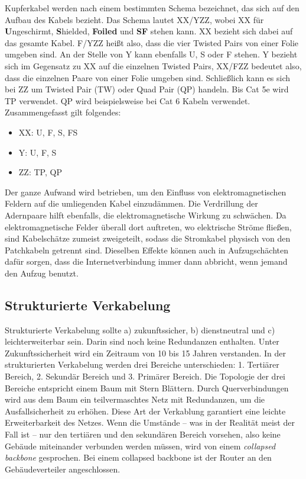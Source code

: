 Kupferkabel werden nach einem bestimmten Schema bezeichnet, das sich auf den Aufbau des Kabels bezieht. Das Schema lautet XX/YZZ, wobei XX für {\bf U}ngeschirmt, {\bf S}hielded, {\bf Foiled} und {\bf SF} stehen kann. XX bezieht sich dabei auf das gesamte Kabel. F/YZZ heißt also, dass die vier Twisted Pairs von einer Folie umgeben sind. An der Stelle von Y kann ebenfalls U, S oder F stehen. Y bezieht sich im Gegensatz zu XX auf die einzelnen Twisted Pairs, XX/FZZ bedeutet also, dass die einzelnen Paare von einer Folie umgeben sind. Schließlich kann es sich bei ZZ um Twisted Pair (TW) oder Quad Pair (QP) handeln. Bis Cat 5e wird TP verwendet. QP wird beispielsweise bei Cat 6 Kabeln verwendet. Zusammengefasst gilt folgendes: 
\begin{itemize}
	\item XX: U, F, S, FS 
	\item  Y: U, F, S
	\item ZZ: TP, QP
\end{itemize}
Der ganze Aufwand wird betrieben, um den Einfluss von elektromagnetischen Feldern auf die umliegenden Kabel einzudämmen.	 Die Verdrillung der Adernpaare hilft ebenfalls, die elektromagnetische Wirkung zu schwächen. Da elektromagnetische Felder überall dort auftreten, wo elektrische Ströme fließen, sind Kabelschätze zumeist zweigeteilt, sodass die Stromkabel physisch von den Patchkabeln getrennt sind. Dieselben Effekte können auch in Aufzugschächten dafür sorgen, dass die Internetverbindung immer dann abbricht, wenn jemand den Aufzug benutzt.

\subsection{Strukturierte Verkabelung}

Strukturierte Verkabelung sollte a) zukunftssicher, b) dienstneutral und c) leichterweiterbar sein. Darin sind noch keine Redundanzen enthalten. Unter Zukunftssicherheit wird ein Zeitraum von 10 bis 15 Jahren verstanden. In der strukturierten Verkabelung werden drei Bereiche unterschieden: 1. Tertiärer Bereich, 2. Sekundär Bereich und 3. Primärer Bereich. Die Topologie der drei Bereiche entspricht einem Baum mit Stern \ql Blättern\qr. Durch Querverbindungen wird aus dem Baum ein teilvermaschtes Netz mit Redundanzen, um die Ausfallsicherheit zu erhöhen. Diese Art der Verkablung garantiert eine leichte Erweiterbarkeit des Netzes. Wenn die Umstände -- was in der Realität meist der Fall ist -- nur den tertiären und den sekundären Bereich vorsehen, also keine Gebäude miteinander verbunden werden müssen, wird von einem {\it collapsed backbone} gesprochen. Bei einem collapsed backbone ist der Router an den Gebäudeverteiler angeschlossen.

